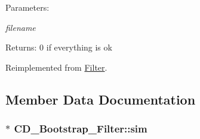 \begin{Desc}
\item[Parameters:]
\begin{description}
\item[{\em filename}]\end{description}
\end{Desc}
\begin{Desc}
\item[Returns:]0 if everything is ok \end{Desc}


Reimplemented from \hyperlink{class_filter_0b7aad4b130b176f423b7f1c0c30a887}{Filter}.

\subsection{Member Data Documentation}
\hypertarget{class_c_d___bootstrap___filter_ac76dfed8e2d0d994558b50a4fe242f7}{
\subsubsection[{sim}]{$\ast$ {\bf CD\_\-Bootstrap\_\-Filter::sim}}}
\label{class_c_d___bootstrap___filter_ac76dfed8e2d0d994558b50a4fe242f7}


